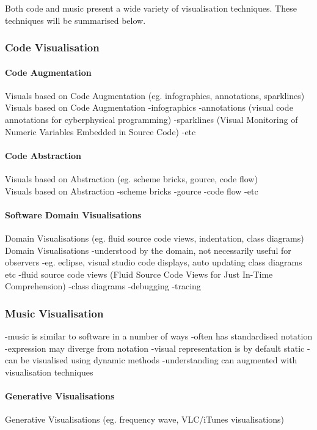 Both code and music present a wide variety of visualisation techniques. These techniques will be summarised below.


\subsubsection{Code Visualisation}
\paragraph{Code Augmentation}
Visuals based on Code Augmentation (eg. infographics, annotations, sparklines)\\
Visuals based on Code Augmentation
-infographics
-annotations (visual code annotations for cyberphysical programming)
-sparklines (Visual Monitoring of Numeric Variables Embedded in Source Code)
-etc

\paragraph{Code Abstraction}
Visuals based on Abstraction (eg. scheme bricks, gource, code flow)\\

Visuals based on Abstraction
-scheme bricks
-gource
-code flow
-etc
\paragraph{Software Domain Visualisations}
Domain Visualisations (eg. fluid source code views, indentation, class diagrams)\\

Domain Visualisations
-understood by the domain, not necessarily useful for observers
-eg. eclipse, visual studio code displays, auto updating class diagrams etc
-fluid source code views (Fluid Source Code Views for Just In-Time Comprehension)
-class diagrams
-debugging
-tracing

\subsubsection{Music Visualisation}
-music is similar to software in a number of ways
-often has standardised notation
-expression may diverge from notation
-visual representation is by default static
-can be visualised using dynamic methods
-understanding can augmented with visualisation techniques

\paragraph{Generative Visualisations}
Generative Visualisations (eg. frequency wave, VLC/iTunes visualisations)\\

